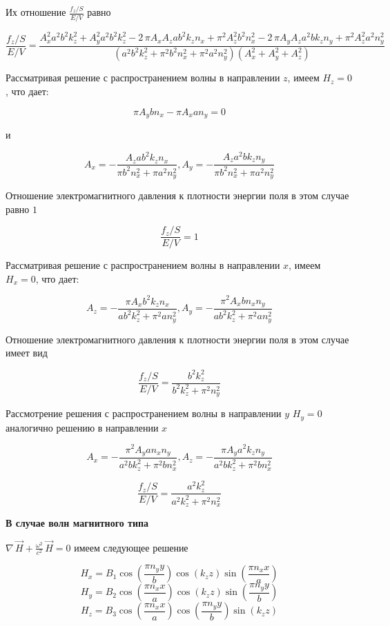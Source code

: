 \documentclass[11pt]{article}
\begin{document}
    Их отношение \(\frac{f_z/S}{E/V}\) равно

    \[\frac{f_z/S}{E/V} = \frac{A_{x}^{2} a^{2} b^{2} k_{z}^{2} + A_{y}^{2} a^{2} b^{2} k_{z}^{2} - 2 \, \pi A_{x} A_{z} a b^{2} k_{z} n_{x} + \pi^{2} A_{z}^{2} b^{2} n_{x}^{2} - 2 \, \pi A_{y} A_{z} a^{2} b k_{z} n_{y} + \pi^{2} A_{z}^{2} a^{2} n_{y}^{2}}{{\left(a^{2} b^{2} k_{z}^{2} + \pi^{2} b^{2} n_{x}^{2} + \pi^{2} a^{2} n_{y}^{2}\right)} {\left(A_{x}^{2} + A_{y}^{2} + A_{z}^{2}\right)}}\]

    Рассматривая решение с распространением волны в направлении \(z\), имеем
\(H_z = 0\), что дает:

    \[\pi A_{y} b n_{x} - \pi A_{x} a n_{y} = 0\]

    и

\[A_{x} = -\frac{A_{z} a b^{2} k_{z} n_{x}}{\pi b^{2} n_{x}^{2} + \pi a^{2} n_{y}^{2}},
A_{y} = -\frac{A_{z} a^{2} b k_{z} n_{y}}{\pi b^{2} n_{x}^{2} + \pi a^{2} n_{y}^{2}}\]

    Отношение электромагнитного давления к плотности энергии поля в этом
случае равно \(1\)

\[\frac{f_z/S}{E/V} = 1\]

    Рассматривая решение с распространением волны в направлении \(x\), имеем
\(H_x = 0\), что дает:

    \[A_{z} = -\frac{\pi A_{x} b^{2} k_{z} n_{x}}{a b^{2} k_{z}^{2} + \pi^{2} a n_{y}^{2}},
A_{y} = -\frac{\pi^{2} A_{x} b n_{x} n_{y}}{a b^{2} k_{z}^{2} + \pi^{2} a n_{y}^{2}}\]

    Отношение электромагнитного давления к плотности энергии поля в этом
случае имеет вид

\[\frac{f_z/S}{E/V} = \frac{b^{2} k_{z}^{2}}{b^{2} k_{z}^{2} + \pi^{2} n_{y}^{2}}\]

    Рассмотрение решения с распространением волны в направлении \(y\)
\(H_y = 0\) аналогично решению в направлении \(x\)

\[A_{x} = -\frac{\pi^{2} A_{y} a n_{x} n_{y}}{a^{2} b k_{z}^{2} + \pi^{2} b n_{x}^{2}},
A_{z} = -\frac{\pi A_{y} a^{2} k_{z} n_{y}}{a^{2} b k_{z}^{2} + \pi^{2} b n_{x}^{2}}\]

\[\frac{f_z/S}{E/V} = \frac{a^{2} k_{z}^{2}}{a^{2} k_{z}^{2} + \pi^{2} n_{x}^{2}}\]

    \textbf{В случае волн магнитного типа}

\(\nabla\,\vec{H} + \frac{\omega^2}{c^2}\,\vec{H} = 0\) имеем следующее
решение

    \[H_{x} = B_{1} \cos\left(\frac{\pi n_{y} y}{b}\right) \cos\left(k_{z} z\right) \sin\left(\frac{\pi n_{x} x}{a}\right)\]
\[H_{y} = B_{2} \cos\left(\frac{\pi n_{x} x}{a}\right) \cos\left(k_{z} z\right) \sin\left(\frac{\pi n_{y} y}{b}\right)\]
\[H_{z} = B_{3} \cos\left(\frac{\pi n_{x} x}{a}\right) \cos\left(\frac{\pi n_{y} y}{b}\right) \sin\left(k_{z} z\right)\]
\end{document}
